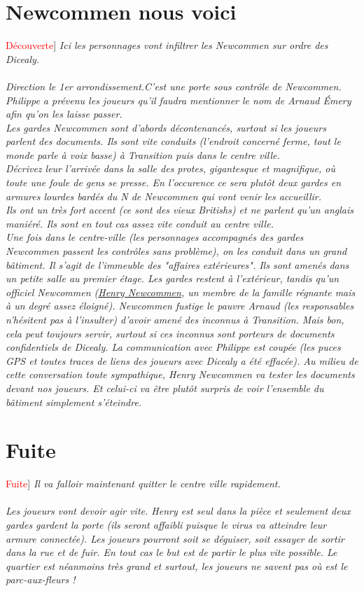 \documentclass[10pt,a4paper,twocolumn]{article}
\newenvironment{lAbstract}[1]{{[}\textcolor{red}{#1}{]}\itshape}{\\ \\}
\begin{document}
\section{Newcommen nous voici}
\begin{lAbstract}{Découverte}
Ici les personnages vont infiltrer les Newcommen sur ordre des Dicealy.
\end{lAbstract}
Direction le 1er arrondissement.C'est une porte sous contrôle de Newcommen. Philippe a prévenu les joueurs qu'il faudra mentionner le nom de Arnaud Émery afin qu'on les laisse passer. \\
Les gardes Newcommen sont d'abords décontenancés, surtout si les joueurs parlent des documents. Ils sont vite conduits (l'endroit concerné ferme, tout le monde parle à voix basse) à Transition puis dans le centre ville.
\\
Décrivez leur l'arrivée dans la salle des protes, gigantesque et magnifique, où toute une foule de gens se presse. En l'occurence ce sera plutôt deux gardes en armures lourdes bardés du N de Newcommen qui vont venir les accueillir.\\
Ils ont un très fort accent (ce sont des vieux Britishs) et ne parlent qu'un anglais maniéré. Ils sont en tout cas assez vite conduit au centre ville.
\\
Une fois dans le centre-ville (les personnages accompagnés des gardes Newcommen passent les contrôles sans problème), on les conduit dans un grand bâtiment. Il s'agit de l'immeuble des "affaires extérieures". Ils sont amenés dans un petite salle au premier étage. Les gardes restent à l'extérieur, tandis qu'un officiel Newcommen (\hyperlink{henry}{Henry Newcommen}, un membre de la famille régnante mais à un degré assez éloigné).
Newcommen fustige le pauvre Arnaud (les responsables n'hésitent pas à l'insulter) d'avoir amené des inconnus à Transition. Mais bon, cela peut toujours servir, surtout si ces inconnus sont porteurs de documents confidentiels de Dicealy. La communication avec Philippe est coupée (les puces GPS et toutes traces de liens des joueurs avec Dicealy a été effacée).
Au milieu de cette conversation toute sympathique, Henry Newcommen va tester les documents devant nos joueurs. Et celui-ci va être plutôt surpris de voir l'ensemble du bâtiment simplement s'éteindre.

\section{Fuite}
\begin{lAbstract}{Fuite}
Il va falloir maintenant quitter le centre ville rapidement.
\end{lAbstract}
Les joueurs vont devoir agir vite. Henry est seul dans la pièce et seulement deux gardes gardent la porte (ils seront affaibli puisque le virus va atteindre leur armure connectée). Les joueurs pourront soit se déguiser, soit essayer de sortir dans la rue et de fuir. En tout cas le but est de partir le plus vite possible. Le quartier est néanmoins très grand et surtout, les joueurs ne savent pas où est le parc-aux-fleurs !
\end{document}
